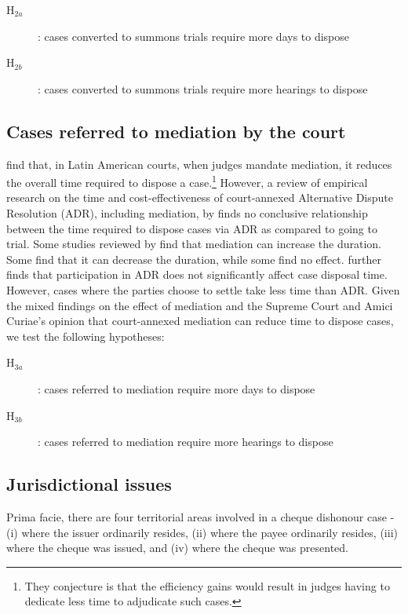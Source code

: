 \begin{description}
\item[H$_{2a}$]: cases converted to summons trials require more days to dispose
\item[H$_{2b}$]: cases converted to summons trials require more hearings to dispose
\end{description}

\subsection{Cases referred to mediation by the court} \label{sec:furth-exam-cases}

\textcite{buscaglia1997_latinAmericaCourtDelays} find that, in Latin American courts, when judges mandate mediation, it reduces the overall time required to dispose a case.\footnote{They conjecture is that the efficiency gains would result in judges having to dedicate less time to adjudicate such cases.} However, a review of empirical research on the time and cost-effectiveness of court-annexed Alternative Dispute Resolution (ADR), including mediation, by \textcite{wissler2004effectiveness} finds no conclusive relationship between the time required to dispose cases via ADR as compared to going to trial. Some studies reviewed by \textcite{wissler2004effectiveness} find that mediation can increase the duration. Some find that it can decrease the duration, while some find no effect. \textcite{heise2010adr} further finds that participation in ADR does not significantly affect case disposal time. However, cases where the parties choose to settle take less time than ADR. Given the mixed findings on the effect of mediation and the Supreme Court and Amici Curiae's opinion that court-annexed mediation can reduce time to dispose cases, we test the following hypotheses:

\begin{description}
\item[H$_{3a}$]: cases referred to mediation require more days to dispose
\item[H$_{3b}$]: cases referred to mediation require more hearings to dispose
\end{description}

\subsection{Jurisdictional issues}

Prima facie, there are four territorial areas involved in a cheque dishonour case - (i) where the issuer ordinarily resides, (ii) where the payee ordinarily resides, (iii) where the cheque was issued, and (iv) where the cheque was presented. 

